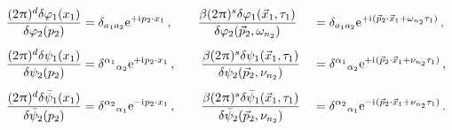 \begin{alignat}{2}
	\frac{(2\piu)^d \delta \MFphi_1(x_1)}{\delta \MFphi_2(p_2)} &= \delta_{a_1 a_2} \eu^{+\iu p_2\cdot x_1} \, ,\qquad%
		\frac{\beta (2\piu)^s\delta \MFphi_1(\vec{x}_1,\tau_1)}{\delta \MFphi_2(\vec{p}_2,\omega_{n_2})} &&= \delta_{a_1 a_2}\eu^{+\iu(\vec{p}_2\cdot\vec{x}_1+\omega_{n_2} \tau_1)} \, ,\\[.5em]
	\frac{(2\piu)^d \delta \MFpsi_1(x_1)}{\delta \MFpsi_2(p_2)} &= \delta^{\alpha_1}{}_{\alpha_2} \eu^{+\iu p_2\cdot x_1} \, ,\qquad%
		\frac{\beta (2\piu)^s\delta \MFpsi_1(\vec{x}_1,\tau_1)}{\delta \MFpsi_2(\vec{p}_2,\nu_{n_2})} &&= \delta^{\alpha_1}{}_{\alpha_2} \eu^{+\iu(\vec{p}_2\cdot\vec{x}_1+\nu_{n_2} \tau_1)} \, ,\\[.5em]
	\frac{(2\piu)^d \delta \MFpsib_1(x_1)}{\delta \MFpsib_2(p_2)} &= \delta^{\alpha_2}{}_{\alpha_1} \eu^{-\iu p_2\cdot x_1} \, ,\qquad%
		\frac{\beta (2\piu)^s\delta \MFpsib_1(\vec{x}_1,\tau_1)}{\delta \MFpsib_2(\vec{p}_2,\nu_{n_2})} &&= \delta^{\alpha_2}{}_{\alpha_1} \eu^{-\iu(\vec{p}_2\cdot\vec{x}_1+\nu_{n_2} \tau_1)} \, .
\end{alignat}\bigskip